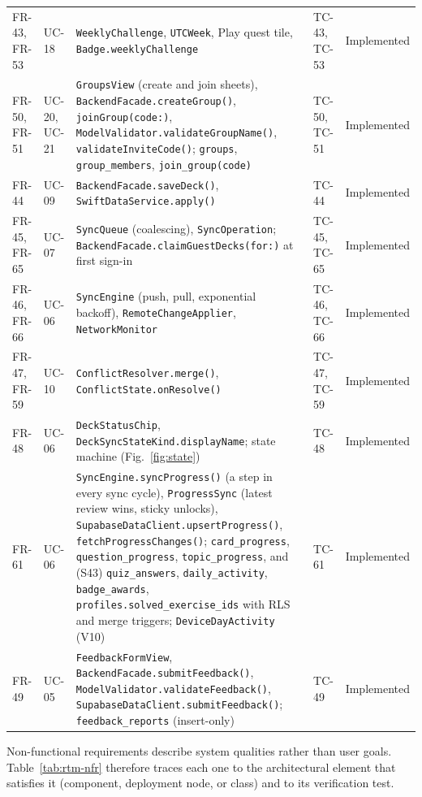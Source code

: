 \documentclass[12pt,letterpaper]{article}
\begin{document}
\begin{xltabular}{\textwidth}{@{}l L{1.6cm} Y L{2.0cm} L{1.9cm}@{}}
FR-43, FR-53 & UC-18 & \texttt{WeeklyChallenge}, \texttt{UTCWeek}, Play quest tile, \texttt{Badge.weeklyChallenge} & TC-43, TC-53 & Implemented \\
FR-50, FR-51 & UC-20, UC-21 & \texttt{GroupsView} (create and join sheets), \texttt{BackendFacade.createGroup()}, \texttt{joinGroup(code:)}, \texttt{ModelValidator.validateGroupName()}, \texttt{validateInviteCode()}; \texttt{groups}, \texttt{group\_members}, \texttt{join\_group(code)} & TC-50, TC-51 & Implemented \\
FR-44 & UC-09 & \texttt{BackendFacade.saveDeck()}, \texttt{SwiftDataService.apply()} & TC-44 & Implemented \\
FR-45, FR-65 & UC-07 & \texttt{SyncQueue} (coalescing), \texttt{SyncOperation}; \texttt{BackendFacade.\allowbreak claimGuestDecks(for:)} at first sign-in & TC-45, TC-65 & Implemented \\
FR-46, FR-66 & UC-06 & \texttt{SyncEngine} (push, pull, exponential backoff), \texttt{RemoteChangeApplier}, \texttt{NetworkMonitor} & TC-46, TC-66 & Implemented \\
FR-47, FR-59 & UC-10 & \texttt{ConflictResolver.merge()}, \texttt{ConflictState.onResolve()} & TC-47, TC-59 & Implemented \\
FR-48 & UC-06 & \texttt{DeckStatusChip}, \texttt{DeckSyncStateKind.displayName}; state machine (Fig.~\ref{fig:state}) & TC-48 & Implemented \\
FR-61 & UC-06 & \texttt{SyncEngine.syncProgress()} (a step in every sync cycle), \texttt{ProgressSync} (latest review wins, sticky unlocks), \texttt{SupabaseDataClient.upsertProgress()}, \texttt{fetchProgressChanges()}; \texttt{card\_progress}, \texttt{question\_progress}, \texttt{topic\_progress}, and (S43) \texttt{quiz\_answers}, \texttt{daily\_activity}, \texttt{badge\_awards}, \texttt{profiles.solved\_exercise\_ids} with RLS and merge triggers; \texttt{DeviceDayActivity} (V10) & TC-61 & Implemented \\
FR-49 & UC-05 & \texttt{FeedbackFormView}, \texttt{BackendFacade.submitFeedback()}, \texttt{ModelValidator.validateFeedback()}, \texttt{SupabaseDataClient.submitFeedback()}; \texttt{feedback\_reports} (insert-only) & TC-49 & Implemented \\
\end{xltabular}

Non-functional requirements describe system qualities rather than user goals.
Table~\ref{tab:rtm-nfr} therefore traces each one to the architectural element that
satisfies it (component, deployment node, or class) and to its verification test.
\end{document}
